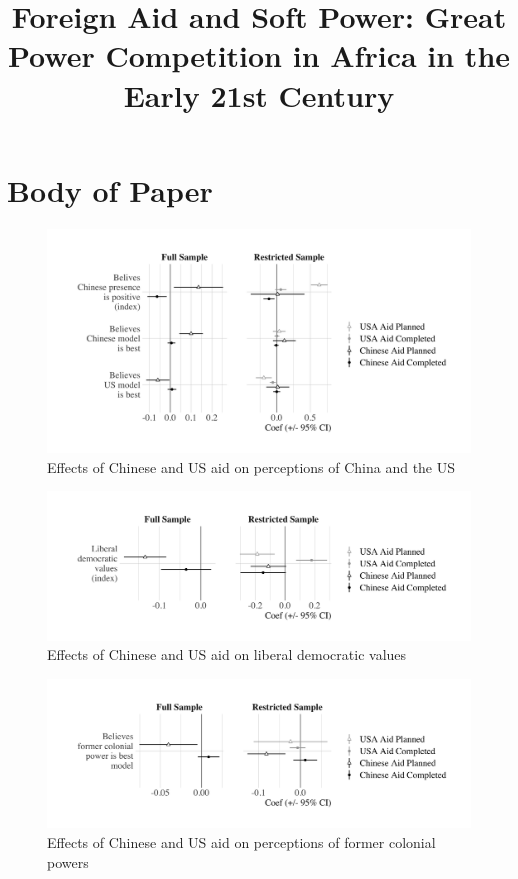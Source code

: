 \documentclass[9pt]{article}
\title{Foreign Aid and Soft Power: Great Power Competition in Africa in the Early 21st Century}
\begin{document}
\maketitle
\tableofcontents

\setlength{\tabcolsep}{5pt}

\newpage
\section{Body of Paper}

\begin{figure}[H]
\centering
\caption{Effects of Chinese and US aid on perceptions of China and the US}
\includegraphics[width=1\textwidth]{figures/figure_01.png}
\end{figure}

\begin{figure}[H]
\centering
\caption{Effects of Chinese and US aid on liberal democratic values}
\includegraphics[width=1\textwidth]{figures/figure_02.png}
\end{figure}

\begin{figure}[H]
\centering
\caption{Effects of Chinese and US aid on perceptions of former colonial powers}
\includegraphics[width=1\textwidth]{figures/figure_03.png}
\end{figure}
\end{document}
